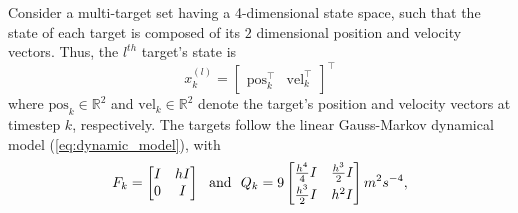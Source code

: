 Consider a multi-target set having a 4-dimensional state space, such that the state of each target is composed of its $2$ dimensional position and velocity vectors. Thus, the $l^{th}$ target's state is \[x_k^{(l)}=\begin{bmatrix}
\textrm{pos}_{k}^\intercal & \textrm{vel}_{k}^\intercal\end{bmatrix}^{\intercal}\] where $\textrm{pos}_{k} \in \mathbb R^2$ and $\textrm{vel}_{k}\in \mathbb R^2$ denote the target's position and velocity vectors at timestep $k$, respectively.
%
The targets follow the linear Gauss-Markov dynamical model (\ref{eq:dynamic_model}), with
\begin{equation}
    F_{k} = \begin{bmatrix}
        I & h I \\
        0 & I
    \end{bmatrix}
\ \ \text{and}\ \ 
    Q_{k} = 9 \begin{bmatrix}
        \frac{h^4}{4} I & \frac{h^3}{2} I \vspace{2pt}\\
         \frac{h^3}{2} I & h^2 I 
    \end{bmatrix} m^2s^{-4}, 
\end{equation}
